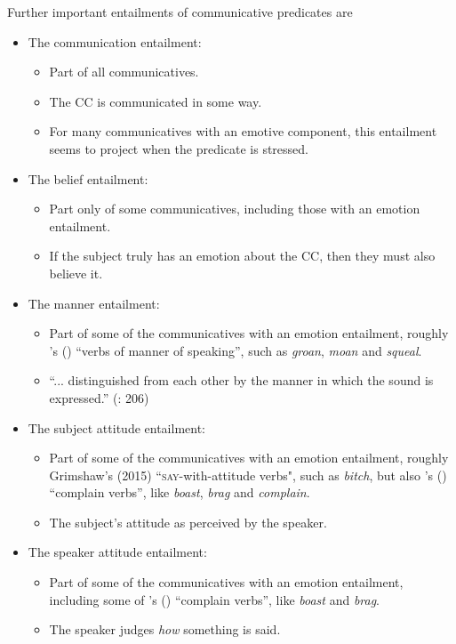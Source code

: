 \documentclass[11pt,fleqn]{article}
\newcommand{\6}{\mbox{$[\hspace*{-.6mm}[$}}
\newcommand{\9}{\mbox{$]\hspace*{-.6mm}]$}}
\newcommand{\citepos}[1]{\citeauthor{#1}'s (\citeyear{#1})}
\begin{document}
Further important entailments of communicative predicates are
\begin{itemize}
	\item The communication entailment:
	\begin{itemize}
		\item Part of all communicatives.
		\item The CC is communicated in some way.
		\item For many communicatives with an emotive component, this entailment seems to project when the predicate is stressed.
	\end{itemize}
	\item The belief entailment:
	\begin{itemize}
		\item Part only of some communicatives, including those with an emotion entailment.
		\item If the subject truly has an emotion about the CC, then they must also believe it. 
	\end{itemize}
	\item The manner entailment:
	\begin{itemize}
		\item Part of some of the communicatives with an emotion entailment, roughly \citepos{levin1993} ``verbs of manner of speaking”, such as \emph{groan}, \emph{moan} and \emph{squeal}.
		\item ``... distinguished from each other by the manner in which the sound is expressed.” (\citealt{levin1993}: 206)
	\end{itemize}
	\item The subject attitude entailment:
\begin{itemize}
	\item Part of some of the communicatives with an emotion entailment, roughly Grimshaw's (2015) ``\textsc{say}-with-attitude verbs", such as \emph{bitch}, but also \citepos{levin1993} ``complain verbs”, like \emph{boast}, \emph{brag} and \emph{complain}.
	\item The subject's attitude as perceived by the speaker.
\end{itemize}	
	\item The speaker attitude entailment:
	\begin{itemize}
		\item Part of some of the communicatives with an emotion entailment, including some of \citepos{levin1993} ``complain verbs”, like \emph{boast} and \emph{brag}.
		\item The speaker judges \emph{how} something is said.

\end{itemize}
\end{itemize}
\end{document}
